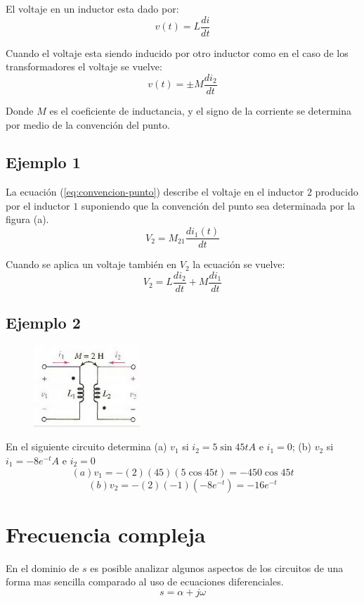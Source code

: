 \documentclass[11pt]{article}
\begin{document}
El voltaje en un inductor esta dado por:
$$v(t)=L \frac{di}{dt}$$

Cuando el voltaje esta siendo inducido por otro inductor como en el
caso de los transformadores el voltaje se vuelve:
$$v(t)=\pm M \frac{di_2}{dt}$$

Donde \(M\) es el coeficiente de inductancia, y el signo de la
corriente se determina por medio de la convención del punto.
\subsection{Ejemplo 1}
\label{sec:orgheadline9}
La ecuación (\ref{eq:convencion-punto}) describe el voltaje en el
inductor \(2\) producido por el inductor \(1\) suponiendo que la
convención del punto sea determinada por la figura (a).
\begin{equation}\label{eq:convencion-punto}
V_2=M_{21}\frac{di_1(t)}{dt}
\end{equation}

Cuando se aplica un voltaje también en \(V_2\) la ecuación se vuelve:
$$V_2=L \frac{di_2}{dt}+M\frac{di_1}{dt}$$
$$$$

\subsection{Ejemplo 2}
\label{sec:orgheadline10}
\begin{figure}
\centering
\includegraphics[width=4cm]{data/f4/1900ab-403b-4c90-9cf4-f6dd53803938/screenshot-20151103-204917.png}
\end{figure}

En el siguiente circuito determina (a) \(v_1\) si \(i_2=5\sin{45t}A\) e
\(i_1=0\); (b) \(v_2\) si \(i_1=-8e^{-t}A\) e \(i_2=0\)
$$(a)v_1=- (2) (45) (5 \cos{45t})=-450 \cos{45t} $$
$$(b)v_2=- (2) (-1) (-8 e^{-t})=-16e^{-t} $$

\section{Frecuencia compleja}
\label{sec:orgheadline15}
En el dominio de \(s\) es posible analizar algunos aspectos de los
circuitos de una forma mas sencilla comparado al uso de ecuaciones
diferenciales.
$$s=\alpha+j\omega$$
\end{document}
